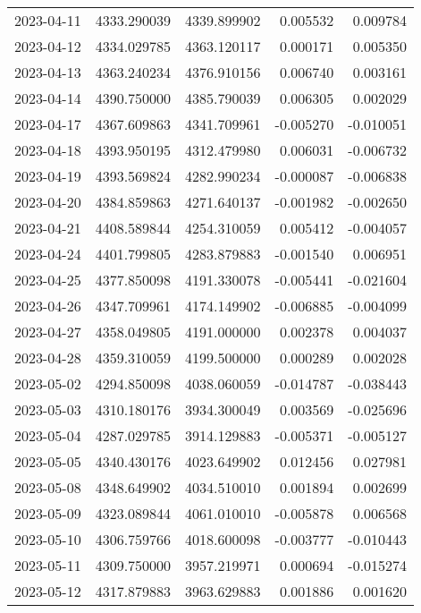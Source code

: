 \begin{tabular}{lrrrr}
2023-04-11 & 4333.290039 & 4339.899902 &        0.005532 &     0.009784 \\
2023-04-12 & 4334.029785 & 4363.120117 &        0.000171 &     0.005350 \\
2023-04-13 & 4363.240234 & 4376.910156 &        0.006740 &     0.003161 \\
2023-04-14 & 4390.750000 & 4385.790039 &        0.006305 &     0.002029 \\
2023-04-17 & 4367.609863 & 4341.709961 &       -0.005270 &    -0.010051 \\
2023-04-18 & 4393.950195 & 4312.479980 &        0.006031 &    -0.006732 \\
2023-04-19 & 4393.569824 & 4282.990234 &       -0.000087 &    -0.006838 \\
2023-04-20 & 4384.859863 & 4271.640137 &       -0.001982 &    -0.002650 \\
2023-04-21 & 4408.589844 & 4254.310059 &        0.005412 &    -0.004057 \\
2023-04-24 & 4401.799805 & 4283.879883 &       -0.001540 &     0.006951 \\
2023-04-25 & 4377.850098 & 4191.330078 &       -0.005441 &    -0.021604 \\
2023-04-26 & 4347.709961 & 4174.149902 &       -0.006885 &    -0.004099 \\
2023-04-27 & 4358.049805 & 4191.000000 &        0.002378 &     0.004037 \\
2023-04-28 & 4359.310059 & 4199.500000 &        0.000289 &     0.002028 \\
2023-05-02 & 4294.850098 & 4038.060059 &       -0.014787 &    -0.038443 \\
2023-05-03 & 4310.180176 & 3934.300049 &        0.003569 &    -0.025696 \\
2023-05-04 & 4287.029785 & 3914.129883 &       -0.005371 &    -0.005127 \\
2023-05-05 & 4340.430176 & 4023.649902 &        0.012456 &     0.027981 \\
2023-05-08 & 4348.649902 & 4034.510010 &        0.001894 &     0.002699 \\
2023-05-09 & 4323.089844 & 4061.010010 &       -0.005878 &     0.006568 \\
2023-05-10 & 4306.759766 & 4018.600098 &       -0.003777 &    -0.010443 \\
2023-05-11 & 4309.750000 & 3957.219971 &        0.000694 &    -0.015274 \\
2023-05-12 & 4317.879883 & 3963.629883 &        0.001886 &     0.001620 \\

\end{tabular}
